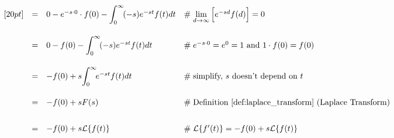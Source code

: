 \documentclass{article}
\theoremstyle{definition}
\begin{document}
\begin{equation*}
\begin{array}{lllll}
[20pt]                                                                                                                                                                                                %
&=& 0  - e^{-s \cdot 0} \cdot f(0)  - \mathlarger{\int}^\infty_0 \!  (-s) e^{-st}  f(t) dt                                                                            &\mathrel{\#} \lim\limits_{d \to \infty}\Big [e^{-sd} f(d) \Big ] = 0                                 \\
[20pt]                                                                                                                                                                                                %
&=& 0 - f(0) - \mathlarger{\int}^\infty_0 \!  (-s) e^{-st}  f(t) dt                                                                                                             &\mathrel{\#} e^{-s \cdot 0} = e^0 = 1 \text{ and } 1 \cdot f(0) = f(0)                          \\
[20pt]                                                                                                                                                                                                %
&=& -f(0) + s \mathlarger{\int}^\infty_0 \!  e^{-st}  f(t) dt                                                                                                                    &\mathrel{\#} \text{simplify, $s$ doesn't depend on $t$}                                           \\
[20pt]                                                                                                                                                                                                 %
&=& -f(0) + s F(s)                                                                                                                                                                              &\mathrel{\#} \text{Definition \ref{def:laplace_transform} (Laplace Transform)}       \\   
[20pt]                                                                                                                                                                                                 %
&=& -f(0) + s \mathcal{L}\{f(t)\}                                                                                                                                                          &\mathrel{\#} \mathcal{L}\{f^\prime(t)\} = -f(0) + s \mathcal{L}\{f(t)\}                                           
\end{array}
\end{equation*}
\end{document}
